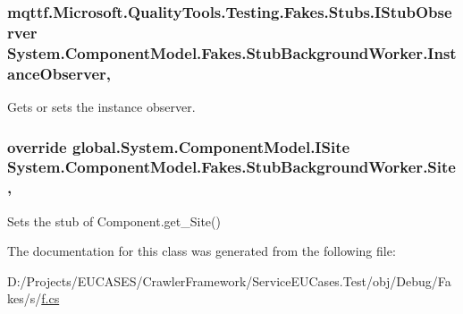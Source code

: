 \hypertarget{class_system_1_1_component_model_1_1_fakes_1_1_stub_background_worker_aa41bafe2ac8c3e981cce196fab230a4b}{
\subsubsection[{Instance\-Observer}]{\setlength{\rightskip}{0pt plus 5cm}mqttf.\-Microsoft.\-Quality\-Tools.\-Testing.\-Fakes.\-Stubs.\-I\-Stub\-Observer System.\-Component\-Model.\-Fakes.\-Stub\-Background\-Worker.\-Instance\-Observer\hspace{0.3cm}{\ttfamily [get]}, {\ttfamily [set]}}}\label{class_system_1_1_component_model_1_1_fakes_1_1_stub_background_worker_aa41bafe2ac8c3e981cce196fab230a4b}


Gets or sets the instance observer.

\hypertarget{class_system_1_1_component_model_1_1_fakes_1_1_stub_background_worker_ae7ab9329a9506b2a59587350073701fe}{
\subsubsection[{Site}]{\setlength{\rightskip}{0pt plus 5cm}override global.\-System.\-Component\-Model.\-I\-Site System.\-Component\-Model.\-Fakes.\-Stub\-Background\-Worker.\-Site\hspace{0.3cm}{\ttfamily [get]}, {\ttfamily [set]}}}\label{class_system_1_1_component_model_1_1_fakes_1_1_stub_background_worker_ae7ab9329a9506b2a59587350073701fe}


Sets the stub of Component.\-get\-\_\-\-Site()



The documentation for this class was generated from the following file\-:\begin{DoxyCompactItemize}
\item 
D\-:/\-Projects/\-E\-U\-C\-A\-S\-E\-S/\-Crawler\-Framework/\-Service\-E\-U\-Cases.\-Test/obj/\-Debug/\-Fakes/s/\hyperlink{s_2f_8cs}{f.\-cs}\end{DoxyCompactItemize}

